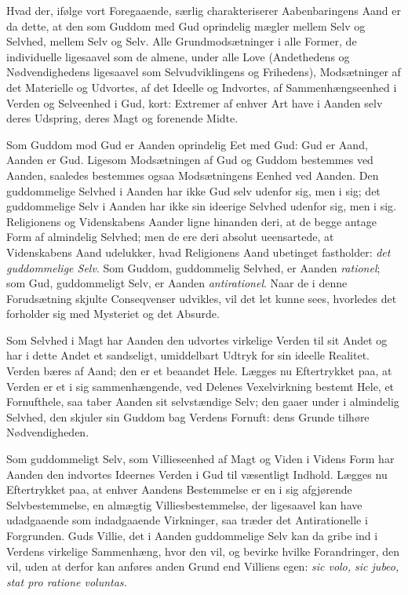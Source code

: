 \documentclass[12pt]{book}
\begin{document}
Hvad der, ifølge vort Foregaaende, særlig charakteriserer
Aabenbaringens Aand er da dette, at den som Guddom med Gud
oprindelig mægler mellem Selv og Selvhed, mellem Selv og Selv. Alle
Grundmodsætninger i alle Former, de individuelle ligesaavel som de
almene, under alle Love (Andethedens og Nødvendighedens ligesaavel
som Selvudviklingens og Frihedens), Modsætninger af det Materielle
og Udvortes, af det Ideelle og Indvortes, af Sammenhængseenhed i
Verden og Selveenhed i Gud, kort: Extremer af enhver Art have i
Aanden selv deres Udspring, deres Magt og forenende Midte.

Som Guddom mod Gud er Aanden oprindelig Eet med Gud: Gud er Aand,
Aanden er Gud. Ligesom Modsætningen af Gud og Guddom bestemmes ved
Aanden, saaledes bestemmes ogsaa Modsætningens Eenhed ved Aanden.
Den guddommelige Selvhed i Aanden har ikke Gud selv udenfor sig, men
i sig; det guddommelige Selv i Aanden har ikke sin ideerige Selvhed
udenfor sig, men i sig. Religionens og Videnskabens Aander ligne
hinanden deri, at de begge antage Form af almindelig Selvhed; men de
ere deri absolut ueensartede, at Videnskabens Aand udelukker, hvad
Religionens Aand ubetinget fastholder: \emph{det guddommelige Selv}.
Som Guddom, guddommelig Selvhed, er Aanden \emph{rationel}; som Gud,
guddommeligt Selv, er Aanden \emph{antirationel}. Naar de i denne
Forudsætning skjulte Conseqvenser udvikles, vil det let kunne sees,
hvorledes det forholder sig med Mysteriet og det Absurde.

Som Selvhed i Magt har Aanden den udvortes virkelige Verden til sit
Andet og har i dette Andet et sandseligt, umiddelbart Udtryk for sin
ideelle Realitet. Verden bæres af Aand; den er et beaandet Hele.
Lægges nu Eftertrykket paa, at Verden er et i sig sammenhængende,
ved Delenes Vexelvirkning bestemt Hele, et Fornufthele, saa taber
Aanden sit selvstændige Selv; den gaaer under
i almindelig Selvhed, den skjuler sin Guddom bag Verdens Fornuft:
dens Grunde tilhøre Nødvendigheden.

Som guddommeligt Selv, som Villieseenhed af Magt og Viden i Videns
Form har Aanden den indvortes Ideernes Verden i Gud til væsentligt
Indhold. Lægges nu Eftertrykket paa, at enhver Aandens Bestemmelse
er en i sig afgjørende Selvbestemmelse, en almægtig
Villiesbestemmelse, der ligesaavel kan have udadgaaende som
indadgaaende Virkninger, saa træder det Antirationelle i
Forgrunden. Guds Villie, det i Aanden guddommelige Selv kan da gribe
ind i Verdens virkelige Sammenhæng, hvor den vil, og bevirke hvilke
Forandringer, den vil, uden at derfor kan anføres anden Grund end
Villiens egen: \textit{sic volo, sic jubeo, stat pro ratione
voluntas.}
\end{document}
